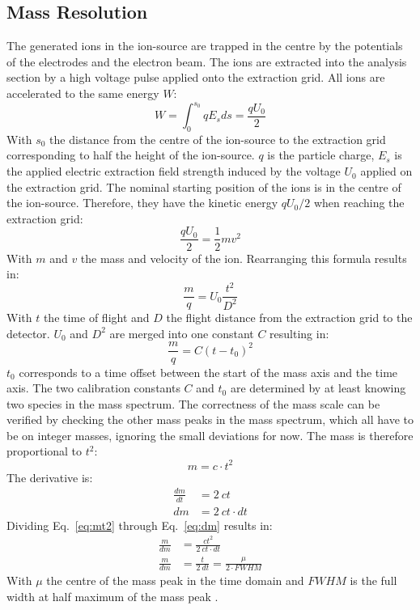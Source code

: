 	\subsection{Mass Resolution}\label{chap:massRes}
	The generated ions in the ion-source are trapped in the centre by the potentials of the electrodes and the electron beam. The ions are extracted into the analysis section by a high voltage pulse applied onto the extraction grid. All ions are accelerated to the same energy $W$:
	\begin{equation}
		W = \int_{0}^{s_0}q E_s ds =  \frac{q U_0}{2}
		\label{eq:WIonPulse}
	\end{equation}
	With $s_0$ the distance from the centre of the ion-source to the extraction grid corresponding to half the height of the ion-source. $q$ is the particle charge, $E_s$ is the applied electric extraction field strength induced by the voltage $U_0$ applied on the extraction grid. The nominal starting position of the ions is in the centre of the ion-source. Therefore, they have the kinetic energy $q U_0/2$ when reaching the extraction grid:
	\begin{equation}
		\frac{q U_0}{2} = \frac{1}{2}m v^2
	\end{equation}
	With $m$ and $v$ the mass and velocity of the ion. Rearranging this formula results in:
	\begin{equation}
		\frac{m}{q} = U_0\frac{t^2}{D^2}
		\label{eq:m/q}
	\end{equation}
	With $t$ the time of flight and $D$ the flight distance from the extraction grid to the detector. $U_0$ and $D^2$ are merged into one constant $C$ resulting in:
	\begin{equation}
		\frac{m}{q} = C(t-t_0)^2
		\label{eq:mass_Calib}
	\end{equation}
	$t_0$ corresponds to a time offset between the start of the mass axis and the time axis. The two calibration constants $C$ and $t_0$ are determined by at least knowing two species in the mass spectrum. The correctness of the mass scale can be verified by checking the other mass peaks in the mass spectrum, which all have to be on integer masses, ignoring the small deviations for now. The mass is therefore proportional to $t^2$:
	\begin{equation}
		m = c\cdot t^2
		\label{eq:mt2}
	\end{equation}
	The derivative is:
	\begin{align}
		\frac{dm}{dt} &= 2~ct\\
		dm &= 2~ct\cdot dt
		\label{eq:dm}
	\end{align}
	Dividing Eq.~\eqref{eq:mt2} through Eq.~\eqref{eq:dm} results in:
	\begin{align}
		\frac{m}{dm} &= \frac{ct^2}{2~ct\cdot dt}\\
		\frac{m}{dm} &= \frac{t}{2~dt} = \frac{\mu}{2\cdot FWHM}
		\label{eq:massRes}
	\end{align}
	With $\mu$ the centre of the mass peak in the time domain and $FWHM$ is the full width at half maximum of the mass peak \cite{LecNot_Wurz2017}.\\
	
